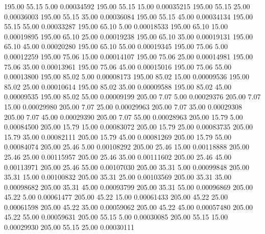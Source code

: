     195.00     55.15      5.00     0.00034592
    195.00     55.15     15.00     0.00035215
    195.00     55.15     25.00     0.00036003
    195.00     55.15     35.00     0.00036084
    195.00     55.15     45.00     0.00034134
    195.00     55.15     55.00     0.00033287
    195.00     65.10      5.00     0.00018533
    195.00     65.10     15.00     0.00019895
    195.00     65.10     25.00     0.00019238
    195.00     65.10     35.00     0.00019131
    195.00     65.10     45.00     0.00020280
    195.00     65.10     55.00     0.00019345
    195.00     75.06      5.00     0.00012259
    195.00     75.06     15.00     0.00014107
    195.00     75.06     25.00     0.00014981
    195.00     75.06     35.00     0.00013961
    195.00     75.06     45.00     0.00015016
    195.00     75.06     55.00     0.00013800
    195.00     85.02      5.00     0.00008173
    195.00     85.02     15.00     0.00009536
    195.00     85.02     25.00     0.00010614
    195.00     85.02     35.00     0.00009588
    195.00     85.02     45.00     0.00009535
    195.00     85.02     55.00     0.00009199
    205.00      7.07      5.00     0.00029376
    205.00      7.07     15.00     0.00029980
    205.00      7.07     25.00     0.00029963
    205.00      7.07     35.00     0.00029308
    205.00      7.07     45.00     0.00029390
    205.00      7.07     55.00     0.00028963
    205.00     15.79      5.00     0.00084500
    205.00     15.79     15.00     0.00083072
    205.00     15.79     25.00     0.00083735
    205.00     15.79     35.00     0.00082111
    205.00     15.79     45.00     0.00081269
    205.00     15.79     55.00     0.00084074
    205.00     25.46      5.00     0.00108292
    205.00     25.46     15.00     0.00118888
    205.00     25.46     25.00     0.00115957
    205.00     25.46     35.00     0.00111602
    205.00     25.46     45.00     0.00113971
    205.00     25.46     55.00     0.00107030
    205.00     35.31      5.00     0.00099848
    205.00     35.31     15.00     0.00100832
    205.00     35.31     25.00     0.00103569
    205.00     35.31     35.00     0.00098682
    205.00     35.31     45.00     0.00093799
    205.00     35.31     55.00     0.00096869
    205.00     45.22      5.00     0.00061477
    205.00     45.22     15.00     0.00061433
    205.00     45.22     25.00     0.00061598
    205.00     45.22     35.00     0.00059062
    205.00     45.22     45.00     0.00057480
    205.00     45.22     55.00     0.00059631
    205.00     55.15      5.00     0.00030085
    205.00     55.15     15.00     0.00029930
    205.00     55.15     25.00     0.00030111
